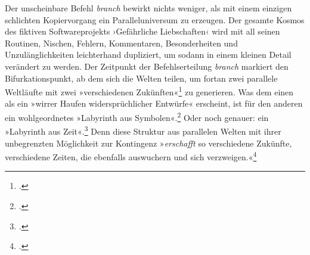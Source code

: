 \documentclass[a4paper,10pt]{article}
\newcommand{\anf}[1]{»#1«}
\newcommand{\inanf}[1]{›#1‹}
\begin{document}
Der unscheinbare Befehl \emph{branch} bewirkt nichts weniger, als mit einem einzigen schlichten Kopiervorgang ein Paralleluniversum zu erzeugen. Der gesamte Kosmos des fiktiven Softwareprojekts \inanf{Gefährliche Liebschaften} wird mit all seinen Routinen, Nischen, Fehlern, Kommentaren, Besonderheiten und Unzulänglichkeiten leichterhand dupliziert, um sodann in einem kleinen Detail verändert zu werden. Der Zeitpunkt der Befehlserteilung \emph{branch} markiert den Bifurkationspunkt, ab dem sich die Welten teilen, um fortan zwei parallele Weltläufte mit zwei \anf{verschiedenen Zukünften}\footcite[169]{borges:1941} zu generieren. Was dem einen als ein \anf{wirrer Haufen widersprüchlicher Entwürfe} erscheint, ist für den anderen ein wohlgeordnetes \anf{Labyrinth aus Symbolen}.\footcite[168]{borges:1941} Oder noch genauer: ein \anf{Labyrinth aus Zeit}.\footcite[168]{borges:1941} Denn diese Struktur aus parallelen Welten mit ihrer unbegrenzten Möglichkeit zur Kontingenz \anf{\emph{erschafft} so verschiedene Zukünfte, verschiedene Zeiten, die ebenfalls auswuchern und sich verzweigen.}\footcite[170]{borges:1941} 
\end{document}
